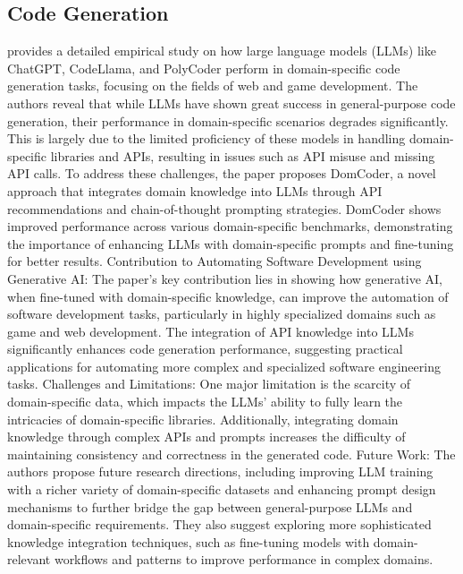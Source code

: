 \subsection{Code Generation}
\citep{gu2023effectiveness} provides a detailed empirical study on how large language models (LLMs) like ChatGPT, CodeLlama, and PolyCoder perform in domain-specific code generation tasks, focusing on the fields of web and game development. The authors reveal that while LLMs have shown great success in general-purpose code generation, their performance in domain-specific scenarios degrades significantly. This is largely due to the limited proficiency of these models in handling domain-specific libraries and APIs, resulting in issues such as API misuse and missing API calls. To address these challenges, the paper proposes DomCoder, a novel approach that integrates domain knowledge into LLMs through API recommendations and chain-of-thought prompting strategies. DomCoder shows improved performance across various domain-specific benchmarks, demonstrating the importance of enhancing LLMs with domain-specific prompts and fine-tuning for better results. 
Contribution to Automating Software Development using Generative AI: The paper's key contribution lies in showing how generative AI, when fine-tuned with domain-specific knowledge, can improve the automation of software development tasks, particularly in highly specialized domains such as game and web development. The integration of API knowledge into LLMs significantly enhances code generation performance, suggesting practical applications for automating more complex and specialized software engineering tasks. 
Challenges and Limitations: One major limitation is the scarcity of domain-specific data, which impacts the LLMs’ ability to fully learn the intricacies of domain-specific libraries. Additionally, integrating domain knowledge through complex APIs and prompts increases the difficulty of maintaining consistency and correctness in the generated code. 
Future Work: The authors propose future research directions, including improving LLM training with a richer variety of domain-specific datasets and enhancing prompt design mechanisms to further bridge the gap between general-purpose LLMs and domain-specific requirements. They also suggest exploring more sophisticated knowledge integration techniques, such as fine-tuning models with domain-relevant workflows and patterns to improve performance in complex domains.

